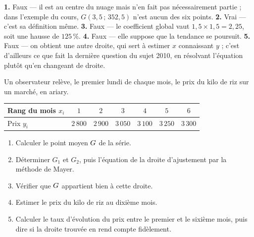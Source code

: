 \begin{corrige}
\textbf{1.} Faux — il est au centre du nuage mais n'en fait pas
nécessairement partie ; dans l'exemple du cours, $G(3{,}5\,;\,352{,}5)$
n'est aucun des six points.
\textbf{2.} Vrai — c'est sa définition même.
\textbf{3.} Faux — le coefficient global vaut $1{,}5\times1{,}5 = 2{,}25$,
soit une hausse de $125\,\%$.
\textbf{4.} Faux — elle suppose que la tendance se poursuit.
\textbf{5.} Faux — on obtient une autre droite, qui sert à estimer $x$
connaissant $y$ ; c'est d'ailleurs ce que fait la dernière question du
sujet 2010, en résolvant l'équation plutôt qu'en changeant de droite.
\end{corrige}

\begin{situation}
Un observateur relève, le premier lundi de chaque mois, le prix du kilo de
riz sur un marché, en ariary.

\begin{center}\footnotesize
\renewcommand{\arraystretch}{1.25}
\begin{tabular}{|l|c|c|c|c|c|c|}
\hline
Rang du mois $x_{i}$ & $1$ & $2$ & $3$ & $4$ & $5$ & $6$\\
\hline
Prix $y_{i}$ & $2\,800$ & $2\,900$ & $3\,050$ & $3\,100$ & $3\,250$ &
$3\,300$\\
\hline
\end{tabular}
\end{center}

\begin{enumerate}[label=\textbf{\arabic*.}, leftmargin=*, itemsep=0.3em]
  \item Calculer le point moyen $G$ de la série.
  \item Déterminer $G_{1}$ et $G_{2}$, puis l'équation de la droite
        d'ajustement par la méthode de Mayer.
  \item Vérifier que $G$ appartient bien à cette droite.
  \item Estimer le prix du kilo de riz au dixième mois.
  \item Calculer le taux d'évolution du prix entre le premier et le sixième
        mois, puis dire si la droite trouvée en rend compte fidèlement.
\end{enumerate}
\end{situation}

